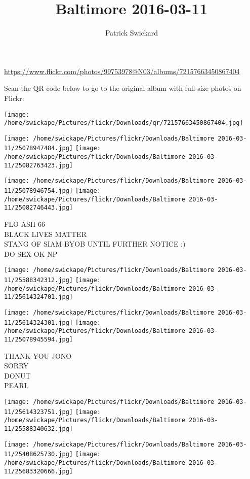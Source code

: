 \documentclass[10pt,letterpaper]{article}
\title{Baltimore 2016-03-11}
\author{Patrick Swickard}
\date{}
\begin{document}
\maketitle

\url{https://www.flickr.com/photos/99753978@N03/albums/72157663450867404}

Scan the QR code below to go to the original album with full-size photos on Flickr:

\texttt{[image: /home/swickape/Pictures/flickr/Downloads/qr/72157663450867404.jpg]}
\pagebreak

\texttt{[image: /home/swickape/Pictures/flickr/Downloads/Baltimore 2016-03-11/25078947484.jpg]}
\texttt{[image: /home/swickape/Pictures/flickr/Downloads/Baltimore 2016-03-11/25082763423.jpg]}

\texttt{[image: /home/swickape/Pictures/flickr/Downloads/Baltimore 2016-03-11/25078946754.jpg]}
\texttt{[image: /home/swickape/Pictures/flickr/Downloads/Baltimore 2016-03-11/25082746443.jpg]}

FLO{-}ASH 66\\
BLACK LIVES MATTER\\
STANG OF SIAM BYOB UNTIL FURTHER NOTICE :)\\
DO SEX OK NP
\pagebreak

\texttt{[image: /home/swickape/Pictures/flickr/Downloads/Baltimore 2016-03-11/25588342312.jpg]}
\texttt{[image: /home/swickape/Pictures/flickr/Downloads/Baltimore 2016-03-11/25614324701.jpg]}

\texttt{[image: /home/swickape/Pictures/flickr/Downloads/Baltimore 2016-03-11/25614324301.jpg]}
\texttt{[image: /home/swickape/Pictures/flickr/Downloads/Baltimore 2016-03-11/25078945594.jpg]}

THANK YOU JONO\\
SORRY\\
DONUT\\
PEARL
\pagebreak

\texttt{[image: /home/swickape/Pictures/flickr/Downloads/Baltimore 2016-03-11/25614323751.jpg]}
\texttt{[image: /home/swickape/Pictures/flickr/Downloads/Baltimore 2016-03-11/25588340632.jpg]}

\texttt{[image: /home/swickape/Pictures/flickr/Downloads/Baltimore 2016-03-11/25408625730.jpg]}
\texttt{[image: /home/swickape/Pictures/flickr/Downloads/Baltimore 2016-03-11/25683320666.jpg]}
\end{document}
